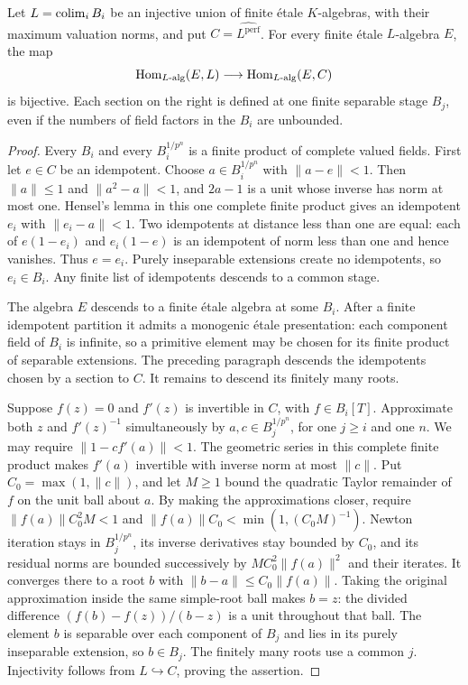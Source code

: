 \begin{lemma}\label{h3:geom:uniform-etale-descent}
Let $L=\operatorname*{colim}_i B_i$ be an injective union of finite \'etale
$K$-algebras, with their maximum valuation norms, and put
$C=\widehat{L^{\mathrm{perf}}}$.  For every finite \'etale
$L$-algebra $E$, the map
\[
 \operatorname{Hom}_{L\text{-alg}}(E,L)\longrightarrow
 \operatorname{Hom}_{L\text{-alg}}(E,C)
\]
is bijective.  Each section on the right is defined at one
finite separable stage $B_j$, even if the numbers of field
factors in the $B_i$ are unbounded.
\end{lemma}

\begin{proof}
Every $B_i$ and every $B_i^{1/p^n}$ is a finite product of
complete valued fields.  First let $e\in C$ be an idempotent.
Choose $a\in B_i^{1/p^n}$ with $\|a-e\|<1$.  Then
$\|a\|\leq1$ and $\|a^2-a\|<1$, and $2a-1$ is a unit
whose inverse has norm at most one.  Hensel's lemma in this
one complete finite product gives an idempotent $e_i$ with
$\|e_i-a\|<1$.  Two idempotents at distance less than one
are equal: each of $e(1-e_i)$ and $e_i(1-e)$ is an idempotent
of norm less than one and hence vanishes.  Thus $e=e_i$.
Purely inseparable extensions create no idempotents, so
$e_i\in B_i$.  Any finite list of idempotents descends to
a common stage.

The algebra $E$ descends to a finite \'etale algebra at some
$B_i$.  After a finite idempotent partition it admits a
monogenic \'etale presentation: each component field of
$B_i$ is infinite, so a primitive element may be chosen for
its finite product of separable extensions.  The preceding
paragraph descends the idempotents chosen by a section to
$C$.  It remains to descend its finitely many roots.

Suppose $f(z)=0$ and $f'(z)$ is invertible in $C$, with
$f\in B_i[T]$.  Approximate both $z$ and $f'(z)^{-1}$
simultaneously by $a,c\in B_j^{1/p^n}$, for one $j\geq i$
and one $n$.  We may require $\|1-cf'(a)\|<1$.
The geometric series in this complete finite product makes
$f'(a)$ invertible with inverse norm at most $\|c\|$.
Put $C_0=\max(1,\|c\|)$, and let $M\geq1$ bound the
quadratic Taylor remainder of $f$ on the unit ball about
$a$.  By making the approximations closer, require
$\|f(a)\|C_0^2M<1$ and
$\|f(a)\|C_0<\min(1,(C_0M)^{-1})$.
Newton iteration stays in $B_j^{1/p^n}$, its inverse
derivatives stay bounded by $C_0$, and its residual norms
are bounded successively by
$M C_0^2\|f(a)\|^2$ and their iterates.
It converges there to a root $b$ with
$\|b-a\|\leq C_0\|f(a)\|$.
Taking the original approximation inside the same simple-root
ball makes $b=z$: the divided difference
$(f(b)-f(z))/(b-z)$ is a unit throughout that ball.
The element $b$ is separable over each component of $B_j$
and lies in its purely inseparable extension, so $b\in B_j$.
The finitely many roots use a common $j$.  Injectivity follows
from $L\hookrightarrow C$, proving the assertion.
\end{proof}

